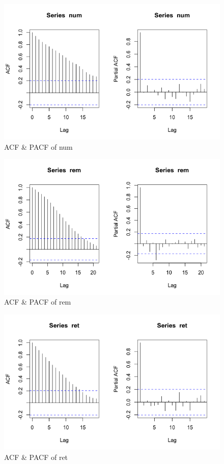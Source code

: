 \documentclass[a4paper]{article}
\begin{document}
\begin{figure}[h!]
\centering
\includegraphics[scale=0.4]{images/acf_pacf_num.png}
\caption{ACF \& PACF of num}
\label{fig:acf_pacf_num}
\end{figure}

\begin{figure}[h!]
\centering
\includegraphics[scale=0.4]{images/acf_pacf_rem.png}
\caption{ACF \& PACF of rem}
\label{fig:acf_pacf_rem}
\end{figure}

\begin{figure}[h!]
\centering
\includegraphics[scale=0.4]{images/acf_pacf_ret.png}
\caption{ACF \& PACF of ret}
\label{fig:acf_pacf_ret}
\end{figure}
\end{document}
